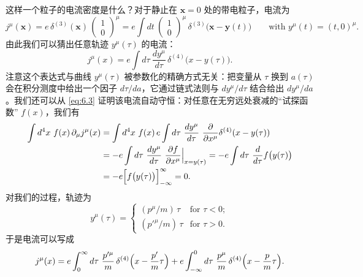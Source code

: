 这样一个粒子的电流密度是什么？对于静止在 $\mathbf{x}=0$ 处的带电粒子，电流为
\begin{equation}
  j^\mu(\mathbf{x}) = e\,\delta^{(3)}(\mathbf{x})\,
    \begin{pmatrix}1\\ 0\end{pmatrix}^{\mu}
  = e\int dt\ \begin{pmatrix}1\\ 0\end{pmatrix}^{\mu}\,
    \delta^{(3)}\bigl( \mathbf{x} - \mathbf{y}(t) \bigr)
  \qquad\text{with } y^\mu(t) = (t, 0)^\mu .
\end{equation}
由此我们可以猜出任意轨迹 $y^\mu(\tau)$ 的电流：
\begin{equation}
  j^\mu(x) = e\int d\tau\ \frac{dy^\mu}{d\tau}\,
    \delta^{(4)}\bigl( x - y(\tau) \bigr).
  \label{eq:6.3}
\end{equation}
注意这个表达式与曲线 $y^\mu(\tau)$ 被参数化的精确方式无关：把变量从 $\tau$ 换到 $a(\tau)$ 会在积分测度中给出一个因子 $d\tau/da$，它通过链式法则与 $dy^\mu/d\tau$ 结合给出 $dy^\mu/da$。我们还可以从 \eqref{eq:6.3} 证明该电流自动守恒：对任意在无穷远处衰减的``试探函数'' $f(x)$，我们有
\begin{equation}
  \begin{aligned}
    \int d^4x\ f(x)\,\partial_\mu j^\mu(x)
    &= \int d^4x\ f(x)\,e\int d\tau\
      \frac{dy^\mu}{d\tau}\ \frac{\partial}{\partial x^\mu}
      \delta^{(4)}(x-y(\tau))\\
    &= -e\int d\tau\ \frac{dy^\mu}{d\tau}\ \frac{\partial f}{\partial x^\mu}
      \Big|_{x=y(\tau)}
    = -e\int d\tau\ \frac{d}{d\tau}f\bigl( y(\tau) \bigr)\\
    &= -e\Bigl[ f\bigl( y(\tau) \bigr) \Bigr]_{-\infty}^{\infty} = 0 .
  \end{aligned}
\end{equation}
对我们的过程，轨迹为
\begin{equation}
  y^\mu(\tau) = \begin{cases}
    (p^\mu/m)\,\tau & \text{for } \tau < 0;\\
    (p'^{\mu}/m)\,\tau & \text{for } \tau > 0 .
  \end{cases}
\end{equation}
于是电流可以写成
\begin{equation}
  j^\mu(x) = e\int_0^{\infty} d\tau\ \frac{p'^{\mu}}{m}\,
    \delta^{(4)}\Bigl( x - \frac{p'}{m}\tau \Bigr)
    + e\int_{-\infty}^{0} d\tau\ \frac{p^{\mu}}{m}\,
      \delta^{(4)}\Bigl( x - \frac{p}{m}\tau \Bigr).
\end{equation}
